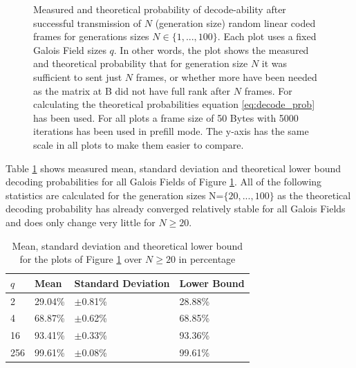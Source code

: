 \documentclass[a4paper,english,10pt]{tumarticle}
\begin{document}
\begin{figure}[htb]
  \hfill
   \caption{Measured
  and theoretical probability of decode-ability after successful transmission of $N$ (generation
  size) random linear coded frames for generations sizes $N\in\{1, ..., 100\}$. Each plot uses a
  fixed Galois Field sizes $q$. In other words, the plot shows the measured and theoretical
  probability that for generation size $N$ it was sufficient to sent just $N$ frames, or whether
  more have been needed as the matrix at B did not have full rank after $N$ frames. For calculating
  the theoretical probabilities equation \eqref{eq:decode_prob} has been used. For all plots a frame
  size of 50 Bytes with 5000 iterations has been used in prefill mode. The y-axis has the same scale
  in all plots to make them easier to compare. }\label{fig:gfs}
\end{figure}

Table \ref{tab:mean-std} shows measured mean, standard deviation and theoretical
lower bound decoding probabilities for all Galois Fields of Figure \ref{fig:gfs}.
All of the following statistics are calculated for the generation sizes N=$\{20,
..., 100\}$ as the theoretical decoding probability has already converged relatively stable for all
Galois Fields and does only change very little for $N\ge20$. 



\begin{table}[htb]
  \caption{Mean, standard deviation and theoretical lower bound for the plots of Figure
  \ref{fig:gfs} over $N\ge20$ in percentage}
  \label{tab:mean-std}
  \centering
  \begin{tabular}{l|l|l|l}
    \toprule
       $q$ & Mean & Standard Deviation & Lower Bound \\
    \midrule
    2 & 29.04\% & $\pm$0.81\% & 28.88\%\\
    4 & 68.87\% & $\pm$0.62\% & 68.85\%\\
    16 & 93.41\% & $\pm$0.33\% & 93.36\%\\
    256 & 99.61\% & $\pm$0.08\% & 99.61\%\\
    \bottomrule
  \end{tabular}
\end{table}
\end{document}

